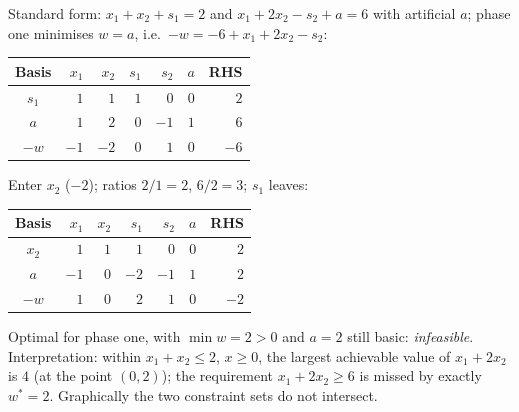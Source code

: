 \begin{solutions}
  \item Standard form: $x_1+x_2+s_1=2$ and $x_1+2x_2-s_2+a=6$ with
        artificial $a$; phase one minimises $w=a$, i.e.\
        $-w=-6+x_1+2x_2-s_2$:
        \begin{center}
        \begin{tabular}{c|rrrrr|r}
        \hline
        Basis & $x_1$ & $x_2$ & $s_1$ & $s_2$ & $a$ & RHS\\
        \hline
        $s_1$ & $1$ & $1$ & $1$ & $0$ & $0$ & $2$\\
        $a$   & $1$ & $2$ & $0$ & $-1$ & $1$ & $6$\\
        \hline
        $-w$ & $-1$ & $-2$ & $0$ & $1$ & $0$ & $-6$\\
        \hline
        \end{tabular}
        \end{center}
        Enter $x_2$ ($-2$); ratios $2/1=2$, $6/2=3$; $s_1$ leaves:
        \begin{center}
        \begin{tabular}{c|rrrrr|r}
        \hline
        Basis & $x_1$ & $x_2$ & $s_1$ & $s_2$ & $a$ & RHS\\
        \hline
        $x_2$ & $1$ & $1$ & $1$ & $0$ & $0$ & $2$\\
        $a$   & $-1$ & $0$ & $-2$ & $-1$ & $1$ & $2$\\
        \hline
        $-w$ & $1$ & $0$ & $2$ & $1$ & $0$ & $-2$\\
        \hline
        \end{tabular}
        \end{center}
        Optimal for phase one, with $\min w=2>0$ and $a=2$ still basic:
        \emph{infeasible}. Interpretation: within $x_1+x_2\le 2$,
        $x\ge 0$, the largest achievable value of $x_1+2x_2$ is $4$ (at
        the point $(0,2)$); the requirement $x_1+2x_2\ge 6$ is missed by
        exactly $w^{*}=2$. Graphically the two constraint sets do not
        intersect.


\end{solutions}
